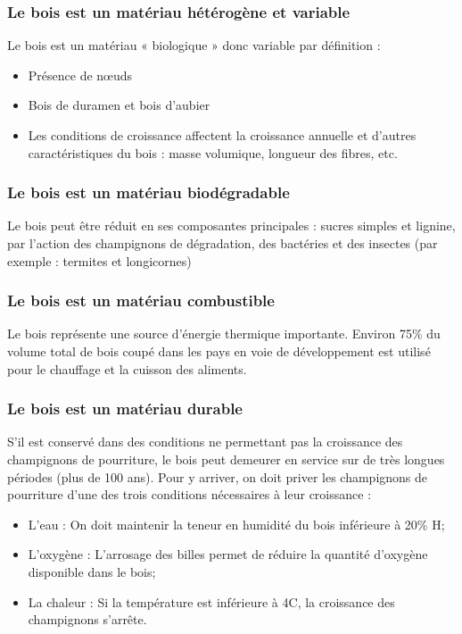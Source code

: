 \subsubsection{Le bois est un matériau hétérogène et variable}

Le bois est un matériau « biologique » donc variable par définition :

\begin{itemize}
\item Présence de nœuds
\item Bois de duramen et bois d'aubier
\item Les conditions de croissance affectent la croissance annuelle et d'autres caractéristiques du bois : masse volumique, longueur des fibres, etc. 
\end{itemize}

\subsubsection{Le bois est un matériau biodégradable}

Le bois peut être réduit en ses composantes principales : sucres simples et lignine, par l'action des champignons de dégradation, des bactéries et des insectes (par exemple : termites et longicornes) 

\subsubsection{Le bois est un matériau combustible}

Le bois représente une source d'énergie thermique importante.  Environ 75\% du volume total de bois coupé dans les pays en voie de développement est utilisé pour le chauffage et la cuisson des aliments.

\subsubsection{Le bois est un matériau durable}

S'il est conservé dans des conditions ne permettant pas la croissance des champignons de pourriture, le bois peut demeurer en service sur de très longues périodes (plus de 100 ans).  Pour y arriver, on doit priver les champignons de pourriture d'une des trois conditions nécessaires à leur croissance :

\begin{itemize}
\item L'eau : On doit maintenir la teneur en humidité du bois inférieure à 20\% H;
\item L'oxygène : L'arrosage des billes permet de réduire la quantité d'oxygène disponible dans le bois;
\item La chaleur : Si la température est inférieure à 4\textdegree C, la croissance des champignons s'arrête.
\end{itemize}

